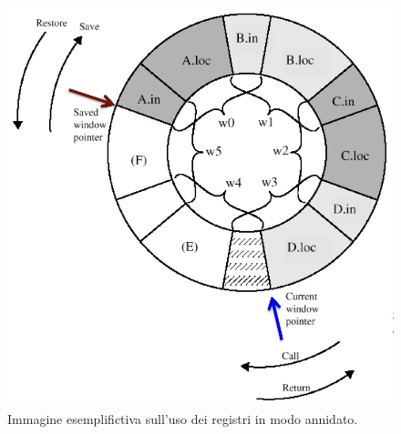 \documentclass{article}
\begin{document}
\begin{figure}[h]
	\centering
	\includegraphics[scale=0.3]{immagini/procedureannidate}
	\caption{Immagine esemplifictiva sull'uso dei registri in modo annidato.}
	\label{procedureannidate}
\end{figure}
\end{document}
